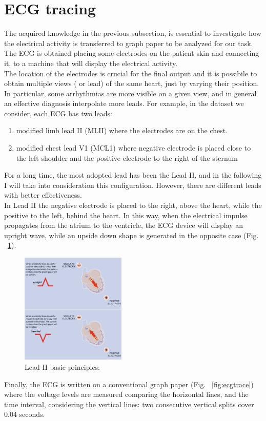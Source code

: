 \documentclass[LaM,binding=0.6cm]{sapthesis}
\begin{document}
\section{ECG tracing}
The acquired knowledge in the previous subsection, is essential to investigate how the electrical activity is transferred to graph paper to be analyzed for our task.\\The ECG is obtained placing some electrodes on the patient skin and connecting it, to a machine that will display the electrical activity.\\The location of the electrodes is crucial for the final output and it is possibile to obtain multiple views ( or lead) of the same heart, just by varying their position.\\In particular, some arrhythmias are more visible on a given view, and in general an effective diagnosis interpolate more leads. For example, in the dataset we consider, each ECG has two leads:
\begin{enumerate}
\item modified limb lead II (MLII) where the electrodes are on the chest.
\item modified chest lead V1 (MCL1) where negative electrode is placed close to the left shoulder and the positive electrode to the right of the sternum 
\end{enumerate}
For a long time, the most adopted lead has been the Lead II, and in the following I will take into consideration this configuration. However, there are different leads with better effectiveness.\\In Lead II the negative electrode is placed to the right, above the heart, while the positive to the left, behind the heart. In this way, when the electrical impulse propagates from the atrium to the ventricle, the ECG device will display an upright wave, while an upside down shape is generated in the opposite case (Fig. ~\ref{fig:ruleflow}).
\begin{figure}[H]
	\includegraphics[width=50mm,scale=0.7]{ruleflow}
	\caption{Lead II basic principles: \cite{ecgbook}}
	\label{fig:ruleflow}
\end{figure}
Finally, the ECG is written on a conventional graph paper (Fig. ~\ref{fig:ecgtrace}) where the voltage levels are measured comparing the horizontal lines, and the time interval, considering the vertical lines: two consecutive vertical splits cover 0.04 seconds.
\end{document}
